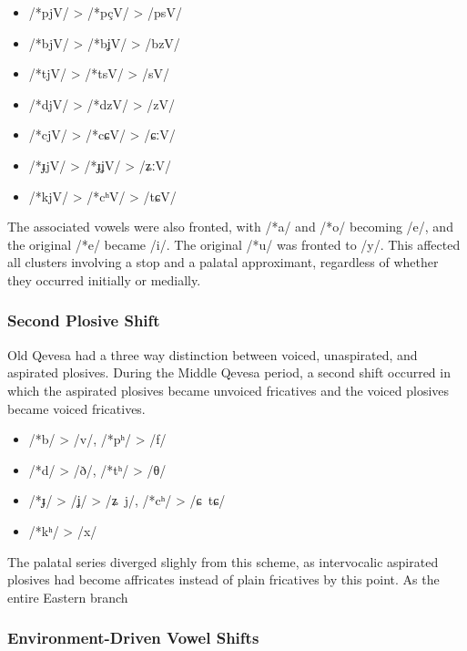 \documentclass[grammar]{subfiles}
\begin{document}
\begin{itemize}
  \item /*pjV/ > /*pçV/ > /psV/
  \item /*bjV/ > /*bʝV/ > /bzV/
  \item /*tjV/ > /*tsV/ > /sV/
  \item /*djV/ > /*dzV/ > /zV/
  \item /*cjV/ > /*cɕV/ > /ɕːV/
  \item /*ɟjV/ > /*ɟʝV/ > /ʑːV/
  \item /*kjV/ > /*cʰV/ > /tɕV/
\end{itemize}

The associated vowels were also fronted, with /*a/ and /*o/ becoming /e/, and
the original /*e/ became /i/.  The original /*u/ was fronted to /y/.  This
affected all clusters involving a stop and a palatal approximant, regardless of
whether they occurred initially or medially.


\subsubsection{Second Plosive Shift}
\label{sssec:history:east:second_plosive_shift}

Old Qevesa had a three way distinction between voiced, unaspirated, and
aspirated plosives.  During the Middle Qevesa period, a second shift occurred
in which the aspirated plosives became unvoiced fricatives and the voiced
plosives became voiced fricatives.  

\begin{itemize}
  \item /*b/ > /v/, /*pʰ/ > /f/
  \item /*d/ > /ð/, /*tʰ/ > /θ/
  \item /*ɟ/ > /ʝ/ > /ʑ~j/, /*cʰ/ > /ɕ~tɕ/
  \item /*kʰ/ > /x/
\end{itemize}

The palatal series diverged slighly from this scheme, as intervocalic aspirated
plosives had become affricates instead of plain fricatives by this point.  As the entire Eastern branch 


\subsubsection{Environment-Driven Vowel Shifts}
\label{sssec:history:east:vowel_shifts}
\end{document}
